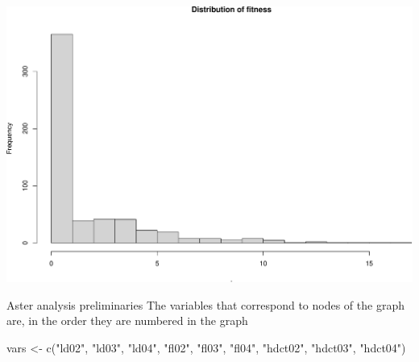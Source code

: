 \documentclass[
  ignorenonframetext,
]{beamer}
\newenvironment{Shaded}{\begin{snugshade}}{\end{snugshade}}
\newcommand{\AttributeTok}[1]{\textcolor[rgb]{0.77,0.63,0.00}{#1}}
\newcommand{\DecValTok}[1]{\textcolor[rgb]{0.00,0.00,0.81}{#1}}
\newcommand{\FunctionTok}[1]{\textcolor[rgb]{0.00,0.00,0.00}{#1}}
\newcommand{\NormalTok}[1]{#1}
\newcommand{\OtherTok}[1]{\textcolor[rgb]{0.56,0.35,0.01}{#1}}
\newcommand{\SpecialCharTok}[1]{\textcolor[rgb]{0.00,0.00,0.00}{#1}}
\newcommand{\StringTok}[1]{\textcolor[rgb]{0.31,0.60,0.02}{#1}}
\begin{document}
\begin{frame}[fragile]{}
\protect\hypertarget{section-8}{}
\tiny

\begin{Shaded}
\end{Shaded}

\includegraphics{week14p2_files/figure-beamer/unnamed-chunk-9-1.pdf}
\end{frame}

\begin{frame}[fragile]{Aster analysis preliminaries}
\protect\hypertarget{aster-analysis-preliminaries}{}
The variables that correspond to nodes of the graph are, in the order
they are numbered in the graph \vspace{12pt}

\begin{Shaded}
\begin{Highlighting}[]
\NormalTok{vars }\OtherTok{\textless{}{-}} \FunctionTok{c}\NormalTok{(}\StringTok{"ld02"}\NormalTok{, }\StringTok{"ld03"}\NormalTok{, }\StringTok{"ld04"}\NormalTok{, }\StringTok{"fl02"}\NormalTok{, }\StringTok{"fl03"}\NormalTok{, }
                    \StringTok{"fl04"}\NormalTok{, }\StringTok{"hdct02"}\NormalTok{, }\StringTok{"hdct03"}\NormalTok{, }\StringTok{"hdct04"}\NormalTok{)}
\end{Highlighting}
\end{Shaded}
\end{frame}
\end{document}
